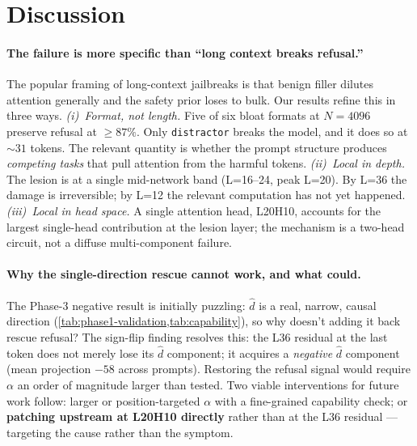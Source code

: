 \documentclass[10pt,twocolumn]{article}
\newcommand{\dhat}{\hat{d}}
\newcommand{\Ncontext}{N}
\theoremstyle{definition}
\begin{document}
\section{Discussion}
\label{sec:discussion}

\paragraph{The failure is more specific than ``long context breaks
refusal.''}
The popular framing of long-context jailbreaks is that benign filler
dilutes attention generally and the safety prior loses to bulk. Our
results refine this in three ways. \emph{(i)~Format, not length.}
Five of six bloat formats at $\Ncontext{=}4096$ preserve refusal at
${\geq}87\%$. Only \texttt{distractor} breaks the model, and it does
so at ${\sim}31$ tokens. The relevant quantity is whether the prompt
structure produces \emph{competing tasks} that pull attention from the
harmful tokens. \emph{(ii)~Local in depth.} The lesion is at a single
mid-network band (L=16--24, peak L=20). By L=36 the damage is
irreversible; by L=12 the relevant computation has not yet happened.
\emph{(iii)~Local in head space.} A single attention head, L20H10,
accounts for the largest single-head contribution at the lesion
layer; the mechanism is a two-head circuit, not a diffuse
multi-component failure.

\paragraph{Why the single-direction rescue cannot work, and what could.}
The Phase-3 negative result is initially puzzling: $\dhat$ is a real,
narrow, causal direction (\cref{tab:phase1-validation,tab:capability}),
so why doesn't adding it back rescue refusal? The sign-flip finding
resolves this: the L36 residual at the last token does not merely lose
its $\dhat$ component; it acquires a \emph{negative} $\dhat$
component (mean projection $-58$ across prompts). Restoring the
refusal signal would require $\alpha$ an order of magnitude larger
than tested. Two viable interventions for future work follow:
larger or position-targeted $\alpha$ with a fine-grained capability
check; or \textbf{patching upstream at L20H10 directly} rather than
at the L36 residual --- targeting the cause rather than the symptom.
\end{document}
